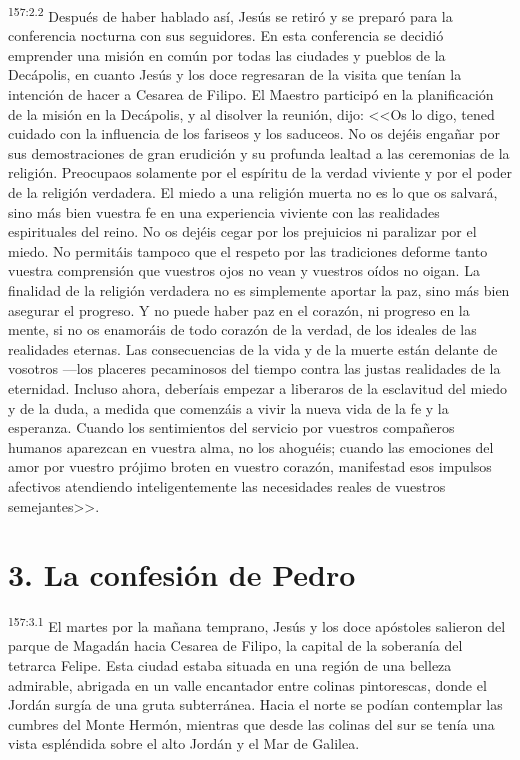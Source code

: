 \par 
\textsuperscript{157:2.2} Después de haber hablado así, Jesús se retiró y se preparó para la conferencia nocturna con sus seguidores. En esta conferencia se decidió emprender una misión en común por todas las ciudades y pueblos de la Decápolis, en cuanto Jesús y los doce regresaran de la visita que tenían la intención de hacer a Cesarea de Filipo. El Maestro participó en la planificación de la misión en la Decápolis, y al disolver la reunión, dijo: <<Os lo digo, tened cuidado con la influencia de los fariseos y los saduceos. No os dejéis engañar por sus demostraciones de gran erudición y su profunda lealtad a las ceremonias de la religión. Preocupaos solamente por el espíritu de la verdad viviente y por el poder de la religión verdadera. El miedo a una religión muerta no es lo que os salvará, sino más bien vuestra fe en una experiencia viviente con las realidades espirituales del reino. No os dejéis cegar por los prejuicios ni paralizar por el miedo. No permitáis tampoco que el respeto por las tradiciones deforme tanto vuestra comprensión que vuestros ojos no vean y vuestros oídos no oigan. La finalidad de la religión verdadera no es simplemente aportar la paz, sino más bien asegurar el progreso. Y no puede haber paz en el corazón, ni progreso en la mente, si no os enamoráis de todo corazón de la verdad, de los ideales de las realidades eternas. Las consecuencias de la vida y de la muerte están delante de vosotros ---los placeres pecaminosos del tiempo contra las justas realidades de la eternidad. Incluso ahora, deberíais empezar a liberaros de la esclavitud del miedo y de la duda, a medida que comenzáis a vivir la nueva vida de la fe y la esperanza. Cuando los sentimientos del servicio por vuestros compañeros humanos aparezcan en vuestra alma, no los ahoguéis; cuando las emociones del amor por vuestro prójimo broten en vuestro corazón, manifestad esos impulsos afectivos atendiendo inteligentemente las necesidades reales de vuestros semejantes>>.

\section*{3. La confesión de Pedro}
\par 
\textsuperscript{157:3.1} El martes por la mañana temprano, Jesús y los doce apóstoles salieron del parque de Magadán hacia Cesarea de Filipo, la capital de la soberanía del tetrarca Felipe. Esta ciudad estaba situada en una región de una belleza admirable, abrigada en un valle encantador entre colinas pintorescas, donde el Jordán surgía de una gruta subterránea. Hacia el norte se podían contemplar las cumbres del Monte Hermón, mientras que desde las colinas del sur se tenía una vista espléndida sobre el alto Jordán y el Mar de Galilea.

